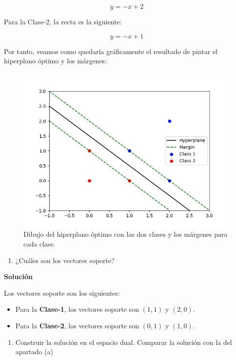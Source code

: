 \documentclass[11pt,a4paper]{article}
\newcommand{\answer}{\noindent\textbf{Solución}}
\begin{document}
\begin{equation}
y = -x + 2
\end{equation}

Para la Clase-2, la recta es la siguiente:

\begin{equation}
y = -x + 1
\end{equation}

Por tanto, veamos como quedaría gráficamente el resultado de pintar el hiperplano óptimo y los márgenes:

\begin{figure}[H]
\centering
\includegraphics[scale=0.6]{img/hyperplane.png}
\caption{Dibujo del hiperplano óptimo con las dos clases y los márgenes para cada clase.}
\end{figure}

\begin{enumerate}[resume,label=\textit{\alph*})]
	\item ¿Cuáles son los vectores soporte?
\end{enumerate}

\answer

Los vectores soporte son los siguientes:

\begin{itemize}[label=\textbullet]
	\item Para la \textbf{Clase-1}, los vectores soporte son $(1, 1)$ y $(2, 0)$.
	\item Para la \textbf{Clase-2}, los vectores soporte son $(0, 1)$ y $(1, 0)$.
\end{itemize}

\begin{enumerate}[resume,label=\textit{\alph*})]
	\item Construir la solución en el espacio dual. Comparar la solución con la del apartado (a)
\end{enumerate}
\end{document}
